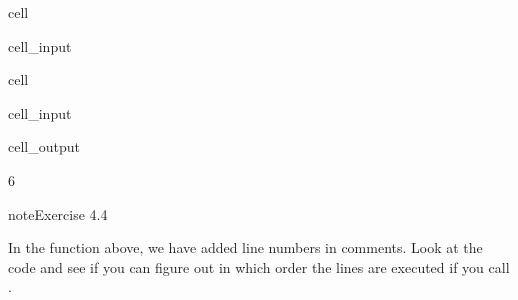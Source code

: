 \documentclass[letterpaper,10pt,english]{jupyterBook}
\begin{document}
\begin{sphinxuseclass}{cell}\begin{sphinxVerbatimInput}

\begin{sphinxuseclass}{cell_input}
\begin{sphinxVerbatim}[commandchars=\\\{\}]
                    
                              
              
                               
                             
\end{sphinxVerbatim}

\end{sphinxuseclass}\end{sphinxVerbatimInput}

\end{sphinxuseclass}
\begin{sphinxuseclass}{cell}\begin{sphinxVerbatimInput}

\begin{sphinxuseclass}{cell_input}
\begin{sphinxVerbatim}[commandchars=\\\{\}]
\end{sphinxVerbatim}

\end{sphinxuseclass}\end{sphinxVerbatimInput}
\begin{sphinxVerbatimOutput}

\begin{sphinxuseclass}{cell_output}
\begin{sphinxVerbatim}[commandchars=\\\{\}]
6
\end{sphinxVerbatim}

\end{sphinxuseclass}\end{sphinxVerbatimOutput}

\end{sphinxuseclass}
\begin{sphinxadmonition}{note}{Exercise 4.4}

\sphinxAtStartPar
In the  function above, we have added line numbers in comments. Look at the code and see if you can figure out in which order the lines are executed if you call .
\end{sphinxadmonition}
\end{document}
